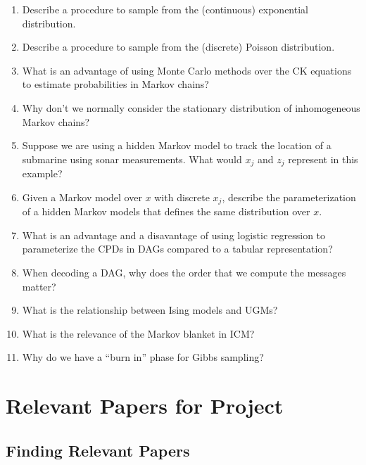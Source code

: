 \documentclass{article}
\def\enum#1{\begin{enumerate}#1\end{enumerate}}
\begin{document}
\enum{
\item Describe a procedure to sample from the (continuous) exponential distribution.
\item Describe a procedure to sample from the (discrete) Poisson distribution.
\item What is an advantage of using Monte Carlo methods over the CK equations to estimate probabilities in Markov chains?
\item Why don't we normally consider the stationary distribution of inhomogeneous Markov chains?
\item Suppose we are using a hidden Markov model to track the location of a submarine using sonar measurements. What would $x_j$ and $z_j$ represent in this example?
\item Given a Markov model over $x$ with discrete $x_j$, describe the parameterization of a hidden Markov models that defines the same distribution over $x$.
\item What is an advantage and a disavantage of using logistic regression to parameterize the CPDs in DAGs compared to a tabular representation?
\item When decoding a DAG, why does the order that we compute the messages matter?
\item What is the relationship between Ising models and UGMs?
\item What is the relevance of the Markov blanket in ICM?
\item Why do we have a ``burn in'' phase for Gibbs sampling?
}


\section{Relevant Papers for Project}

\subsection{Finding Relevant Papers}
\end{document}
